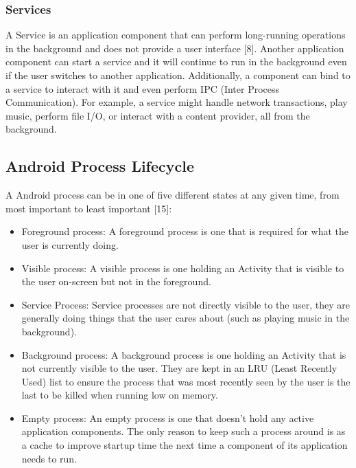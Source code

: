 \documentclass[12pt]{uthesis-v12}  %
\begin{document}
			\subsubsection{Services}
			A Service is an application component that can perform long-running operations in the background and does not provide a user interface [8]. Another application component can start a service and it will continue to run in the background even if the user switches to another application. Additionally, a component can bind to a service to interact with it and even perform IPC (Inter Process Communication). For example, a service might handle network transactions, play music, perform file I/O, or interact with a content provider, all from the background.
					
		\subsection{Android Process Lifecycle}
			A Android process can be in one of five different states at any given time, from most important to least important [15]:
			
				\begin{itemize}
					\item Foreground process: A foreground process is one that is required for what the user is currently doing.
					
					\item Visible process: A visible process is one holding an Activity that is visible to the user on-screen but not in the foreground.
					
					\item Service Process: Service processes are not directly visible to the user, they are generally doing things that the user cares about (such as playing music in the background). 
					
					\item Background process: A background process is one holding an Activity that is not currently visible to the user. They are kept in an LRU (Least Recently Used) list to ensure the process that was most recently seen by the user is the last to be killed when running low on memory.  
					
					\item Empty process: An empty process is one that doesn't hold any active application components. The only reason to keep such a process around is as a cache to improve startup time the next time a component of its application needs to run.				
				\end{itemize}
				
\end{document}
